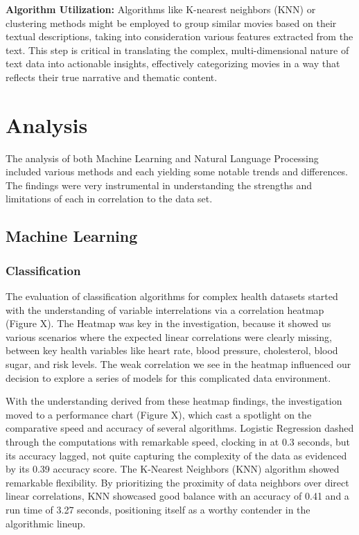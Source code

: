 \documentclass{article}
\begin{document}
\begin{multicols}{2}
\textbf{Algorithm Utilization:}
Algorithms like K-nearest neighbors (KNN) or clustering methods might be employed to group similar movies based on their textual descriptions, taking into consideration various features extracted from the text. This step is critical in translating the complex, multi-dimensional nature of text data into actionable insights, effectively categorizing movies in a way that reflects their true narrative and thematic content.

\section{Analysis}

The analysis of both Machine Learning and Natural Language Processing included various methods and each yielding some notable trends and differences. The findings were very instrumental in understanding the strengths and limitations of each in correlation to the data set. 

\subsection{Machine Learning}

\subsubsection{Classification}

The evaluation of classification algorithms for complex health datasets started with the understanding of variable interrelations via a correlation heatmap (Figure X). The Heatmap was key in the investigation, because it showed us various scenarios where the expected linear correlations were clearly missing, between key health variables like heart rate, blood pressure, cholesterol, blood sugar, and risk levels. The weak correlation we see in the heatmap influenced our decision to explore a series of models for this complicated data environment.

With the understanding derived from these heatmap findings, the investigation moved to a performance chart (Figure X), which cast a spotlight on the comparative speed and accuracy of several algorithms. Logistic Regression dashed through the computations with remarkable speed, clocking in at 0.3 seconds, but its accuracy lagged, not quite capturing the complexity of the data as evidenced by its 0.39 accuracy score. The K-Nearest Neighbors (KNN) algorithm showed remarkable flexibility. By prioritizing the proximity of data neighbors over direct linear correlations, KNN showcased good balance with an accuracy of 0.41 and a run time of 3.27 seconds, positioning itself as a worthy contender in the algorithmic lineup.


\end{multicols}
\end{document}
